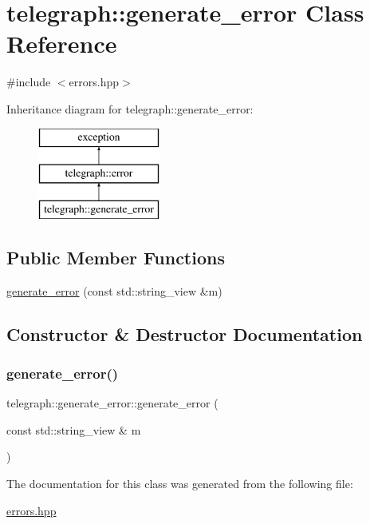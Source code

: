 \hypertarget{classtelegraph_1_1generate__error}{}\section{telegraph\+:\+:generate\+\_\+error Class Reference}
\label{classtelegraph_1_1generate__error}


{\ttfamily \#include $<$errors.\+hpp$>$}

Inheritance diagram for telegraph\+:\+:generate\+\_\+error\+:\begin{figure}[H]
\begin{center}
\leavevmode
\includegraphics[height=3.000000cm]{classtelegraph_1_1generate__error}
\end{center}
\end{figure}
\subsection*{Public Member Functions}
\begin{DoxyCompactItemize}
\item 
\hyperlink{classtelegraph_1_1generate__error_aec3b4c0f38f32f0ed423e65187da0601}{generate\+\_\+error} (const std\+::string\+\_\+view \&m)
\end{DoxyCompactItemize}


\subsection{Constructor \& Destructor Documentation}
\mbox{\label{classtelegraph_1_1generate__error_aec3b4c0f38f32f0ed423e65187da0601}} 
\subsubsection{\texorpdfstring{generate\+\_\+error()}{generate\_error()}}
{\footnotesize\ttfamily telegraph\+::generate\+\_\+error\+::generate\+\_\+error (\begin{DoxyParamCaption}\item[{const std\+::string\+\_\+view \&}]{m }\end{DoxyParamCaption})\hspace{0.3cm}{\ttfamily [inline]}}



The documentation for this class was generated from the following file\+:\begin{DoxyCompactItemize}
\item 
\hyperlink{errors_8hpp}{errors.\+hpp}\end{DoxyCompactItemize}
